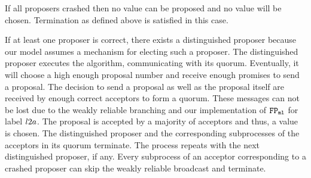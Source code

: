 If all proposers crashed then no value can be proposed and no value will be chosen.
Termination as defined above is satisfied in this case.

If at least one proposer is correct, there exists a distinguished proposer because our model assumes a mechanism for electing such a proposer.
The distinguished proposer executes the algorithm, communicating with its quorum.
Eventually, it will choose a high enough proposal number and receive enough promises to send a proposal.
The decision to send a proposal as well as the proposal itself are received by enough correct acceptors to form a quorum.
These messages can not be lost due to the weakly reliable branching and our implementation of $\mathtt{FP_{ml}}$ for label $l2a$.
The proposal is accepted by a majority of acceptors and thus, a value is chosen.
The distinguished proposer and the corresponding subprocesses of the acceptors in its quorum terminate.
The process repeats with the next distinguished proposer, if any.
Every subprocess of an acceptor corresponding to a crashed proposer can skip the weakly reliable broadcast and terminate.

